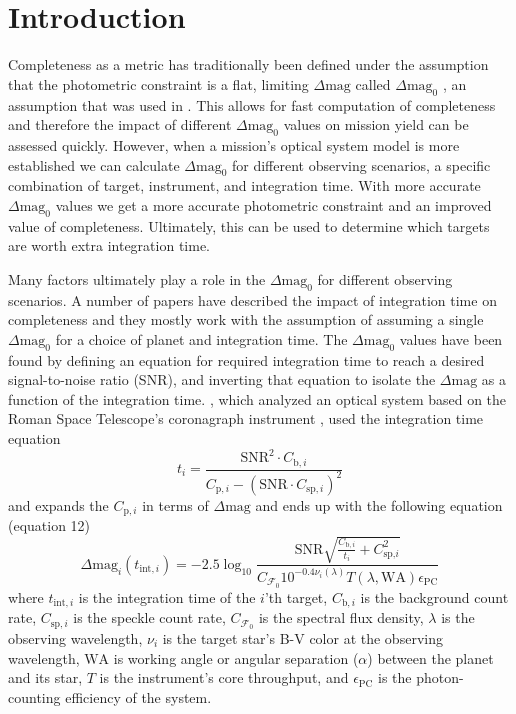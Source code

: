 \section{Introduction}%
\label{sec:ch2_intro}

Completeness as a metric has traditionally been defined under the assumption
that the photometric constraint is a flat, limiting $\Delta\textrm{mag}$ called
$\Delta\textrm{mag}_0$ \citep{brownSingleVisitPhotometric2005}, an assumption
that was used in . This allows for fast computation of
completeness and therefore the impact of different $\Delta\textrm{mag}_0$
values on mission yield can be assessed quickly. However, when a mission's optical
system model is more established we can calculate $\Delta\textrm{mag}_0$ for
different observing scenarios, a specific combination of target, instrument,
and integration time. With more accurate $\Delta\textrm{mag}_0$ values we get a
more accurate photometric constraint and an improved value of completeness.
Ultimately, this can be used to determine which targets are worth extra
integration time.

Many factors ultimately play a role in the $\Delta\textrm{mag}_0$ for different
observing scenarios. A number of papers have described the impact of
integration time on completeness \citep{hunyadiSingleVisitCompleteness2005,
  brownNewCompletenessMethods2010, starkMaximizingExoEarthCandidate2014,
keithlyOptimalScheduling2020} and they mostly work with the assumption of
assuming a single $\Delta\textrm{mag}_0$ for a choice of planet and integration
time. The $\Delta\textrm{mag}_0$ values have been found by defining an equation
for required integration time to reach a desired signal-to-noise ratio (SNR),
and inverting that equation to isolate the $\Delta\textrm{mag}$ as a function
of the integration time. \citet{keithlyOptimalScheduling2020}, which
analyzed an optical system based on the Roman Space Telescope's coronagraph
instrument \citep{Nemati2014}, used the integration time equation
\begin{equation}
  t_i = \frac{\textrm{SNR}^2 \cdot C_{\textrm{b}, i}}{C_{\textrm{p}, i} - \left( \textrm{SNR} \cdot C_{\textrm{sp},i} \right)^2}
  \label{eq:dean_inttime}
\end{equation}
and expands the $C_{\textrm{p}, i}$ in terms of $\Delta\textrm{mag}$ and ends
up with the following equation (equation 12)
\begin{equation}
  \Delta\textrm{mag}_i(t_{\textrm{int},i}) = -2.5 \log_{10} \frac{\textrm{SNR} \sqrt{\frac{C_{\textrm{b},
  i}}{t_i} + C_{\textrm{sp,}i}^2}}{C_{\mathcal{F}_0} 10^{-0.4 \nu_i (\lambda)}
T(\lambda, \textrm{WA}) \epsilon_{\textrm{PC}}}
  \label{eq:dean_dmag}
\end{equation}
where $t_{\textrm{int},i}$ is the integration time of the $i$'th target,
$C_{\textrm{b},i}$ is the background count rate,
$C_{\textrm{sp},i}$ is the speckle count rate,
$C_{\mathcal{F}_0}$ is the spectral flux density,
$\lambda$ is the observing wavelength,
$\nu_i$ is the target star's B-V color at the observing wavelength,
$\textrm{WA}$ is working angle or angular separation ($\alpha$) between the planet and its star,
$T$ is the instrument's core throughput,
and $\epsilon_{\textrm{PC}}$ is the photon-counting efficiency of the system.

